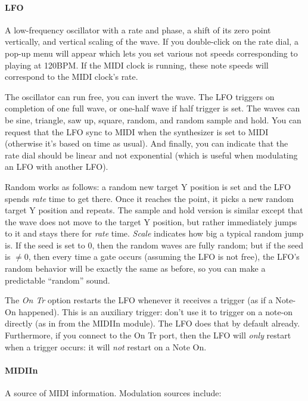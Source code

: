 \documentclass{article}
\begin{document}
\paragraph{LFO}  A low-frequency oscillator with a rate and phase, a shift of its zero point vertically, and vertical scaling of the wave.   If you double-click on the rate dial, a pop-up menu will appear which lets you set various not speeds corresponding to playing at 120BPM.  If the MIDI clock is running, these note speeds will correspond to the MIDI clock's rate.

The oscillator can run free, you can invert the wave.    The LFO triggers on completion of one full wave, or one-half wave if half trigger is set.  The waves can be sine, triangle, saw up, square, random, and random sample and hold.   You can request that the LFO sync to MIDI when the synthesizer is set to MIDI (otherwise it's based on time as usual).  And finally, you can indicate that the rate dial should be linear and not exponential (which is useful when modulating an LFO with another LFO).

Random works as follows: a random new target Y position is set and the LFO spends {\it rate} time to get there.  Once it reaches the point, it picks a new random target Y position and repeats.  The sample and hold version is similar except that the wave does not move to the target Y position, but rather immediately jumps to it and stays there for {\it rate} time.   {\it Scale} indicates how big a typical random jump is.  If the seed is set to 0, then the random waves are fully random; but if the seed is \(\neq 0\), then every time a gate occurs (assuming the LFO is not free), the LFO's random behavior will be exactly the same as before, so you can make a predictable ``random'' sound.

The {\it On Tr} option restarts the LFO whenever it receives a trigger (as if a Note-On happened).  This is an auxiliary trigger: don't use it to trigger on a note-on directly (as in from the MIDIIn module).  The LFO does that by default already.  Furthermore, if you connect to the On Tr port, then the LFO will {\it only} restart when a trigger occurs: it will {\it not} restart on a Note On.

\paragraph{MIDIIn}  A source of MIDI information.  Modulation sources include:
\end{document}
